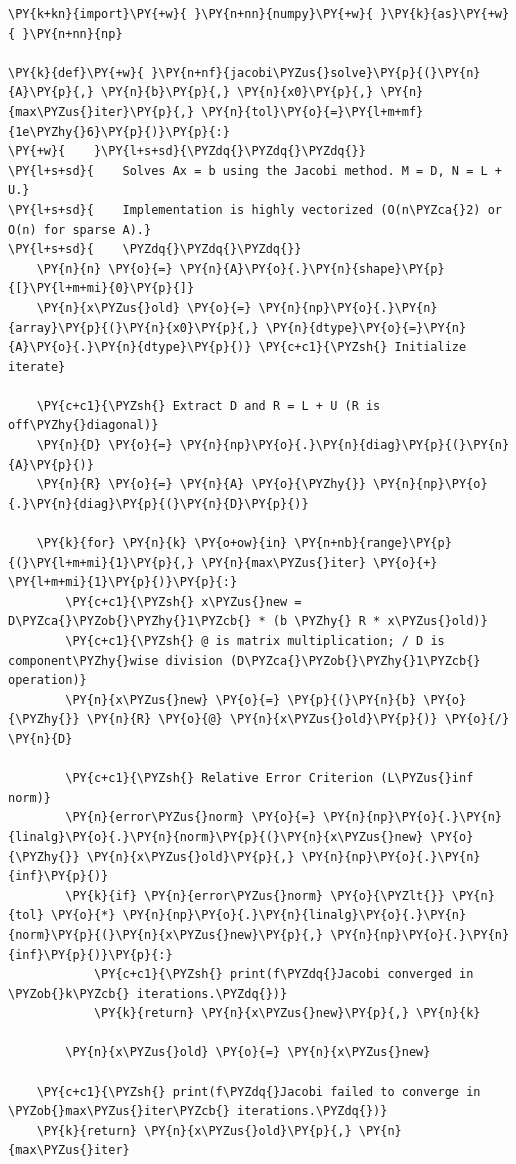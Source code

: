 \begin{Verbatim}[commandchars=\\\{\}]
\PY{k+kn}{import}\PY{+w}{ }\PY{n+nn}{numpy}\PY{+w}{ }\PY{k}{as}\PY{+w}{ }\PY{n+nn}{np}

\PY{k}{def}\PY{+w}{ }\PY{n+nf}{jacobi\PYZus{}solve}\PY{p}{(}\PY{n}{A}\PY{p}{,} \PY{n}{b}\PY{p}{,} \PY{n}{x0}\PY{p}{,} \PY{n}{max\PYZus{}iter}\PY{p}{,} \PY{n}{tol}\PY{o}{=}\PY{l+m+mf}{1e\PYZhy{}6}\PY{p}{)}\PY{p}{:}
\PY{+w}{    }\PY{l+s+sd}{\PYZdq{}\PYZdq{}\PYZdq{}}
\PY{l+s+sd}{    Solves Ax = b using the Jacobi method. M = D, N = L + U.}
\PY{l+s+sd}{    Implementation is highly vectorized (O(n\PYZca{}2) or O(n) for sparse A).}
\PY{l+s+sd}{    \PYZdq{}\PYZdq{}\PYZdq{}}
    \PY{n}{n} \PY{o}{=} \PY{n}{A}\PY{o}{.}\PY{n}{shape}\PY{p}{[}\PY{l+m+mi}{0}\PY{p}{]}
    \PY{n}{x\PYZus{}old} \PY{o}{=} \PY{n}{np}\PY{o}{.}\PY{n}{array}\PY{p}{(}\PY{n}{x0}\PY{p}{,} \PY{n}{dtype}\PY{o}{=}\PY{n}{A}\PY{o}{.}\PY{n}{dtype}\PY{p}{)} \PY{c+c1}{\PYZsh{} Initialize iterate}
    
    \PY{c+c1}{\PYZsh{} Extract D and R = L + U (R is off\PYZhy{}diagonal)}
    \PY{n}{D} \PY{o}{=} \PY{n}{np}\PY{o}{.}\PY{n}{diag}\PY{p}{(}\PY{n}{A}\PY{p}{)}
    \PY{n}{R} \PY{o}{=} \PY{n}{A} \PY{o}{\PYZhy{}} \PY{n}{np}\PY{o}{.}\PY{n}{diag}\PY{p}{(}\PY{n}{D}\PY{p}{)}
    
    \PY{k}{for} \PY{n}{k} \PY{o+ow}{in} \PY{n+nb}{range}\PY{p}{(}\PY{l+m+mi}{1}\PY{p}{,} \PY{n}{max\PYZus{}iter} \PY{o}{+} \PY{l+m+mi}{1}\PY{p}{)}\PY{p}{:}
        \PY{c+c1}{\PYZsh{} x\PYZus{}new = D\PYZca{}\PYZob{}\PYZhy{}1\PYZcb{} * (b \PYZhy{} R * x\PYZus{}old)}
        \PY{c+c1}{\PYZsh{} @ is matrix multiplication; / D is component\PYZhy{}wise division (D\PYZca{}\PYZob{}\PYZhy{}1\PYZcb{} operation)}
        \PY{n}{x\PYZus{}new} \PY{o}{=} \PY{p}{(}\PY{n}{b} \PY{o}{\PYZhy{}} \PY{n}{R} \PY{o}{@} \PY{n}{x\PYZus{}old}\PY{p}{)} \PY{o}{/} \PY{n}{D} 
        
        \PY{c+c1}{\PYZsh{} Relative Error Criterion (L\PYZus{}inf norm)}
        \PY{n}{error\PYZus{}norm} \PY{o}{=} \PY{n}{np}\PY{o}{.}\PY{n}{linalg}\PY{o}{.}\PY{n}{norm}\PY{p}{(}\PY{n}{x\PYZus{}new} \PY{o}{\PYZhy{}} \PY{n}{x\PYZus{}old}\PY{p}{,} \PY{n}{np}\PY{o}{.}\PY{n}{inf}\PY{p}{)}
        \PY{k}{if} \PY{n}{error\PYZus{}norm} \PY{o}{\PYZlt{}} \PY{n}{tol} \PY{o}{*} \PY{n}{np}\PY{o}{.}\PY{n}{linalg}\PY{o}{.}\PY{n}{norm}\PY{p}{(}\PY{n}{x\PYZus{}new}\PY{p}{,} \PY{n}{np}\PY{o}{.}\PY{n}{inf}\PY{p}{)}\PY{p}{:}
            \PY{c+c1}{\PYZsh{} print(f\PYZdq{}Jacobi converged in \PYZob{}k\PYZcb{} iterations.\PYZdq{})}
            \PY{k}{return} \PY{n}{x\PYZus{}new}\PY{p}{,} \PY{n}{k}
            
        \PY{n}{x\PYZus{}old} \PY{o}{=} \PY{n}{x\PYZus{}new}
        
    \PY{c+c1}{\PYZsh{} print(f\PYZdq{}Jacobi failed to converge in \PYZob{}max\PYZus{}iter\PYZcb{} iterations.\PYZdq{})}
    \PY{k}{return} \PY{n}{x\PYZus{}old}\PY{p}{,} \PY{n}{max\PYZus{}iter}
\end{Verbatim}
